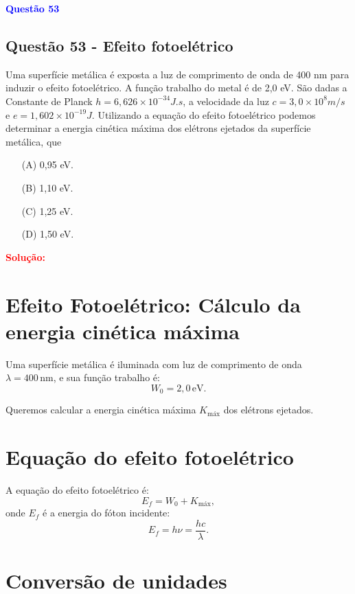 \begin{flushleft}
\textbf{\textcolor{blue}{\Large Quest\~ao 53}}\\
\noindent
\subsection{Quest\~ao 53 - Efeito fotoelétrico}
Uma superfície metálica é exposta a luz de comprimento de onda de 400 nm para induzir o efeito fotoelétrico. A função
trabalho do metal é de 2,0 eV. São dadas a Constante de Planck $h = 6{,}626 \times 10^{-34} J.s$, a velocidade da luz 
$c = 3{,}0 \times 10^8 m/s$ e $e = 1{,}602 \times 10^{-19} J$. Utilizando a equação do efeito fotoelétrico podemos 
determinar a energia cinética máxima dos elétrons ejetados da superfície metálica, que

\begin{itemize}
\item[(A)] 0,95 eV.
\item[(B)] 1,10 eV.
\item[(C)] 1,25 eV.
\item[(D)] 1,50 eV.
\end{itemize}

\vspace{0.5cm}

\textcolor{red}{\textbf{Solução:}}\\

\section*{Efeito Fotoelétrico: Cálculo da energia cinética máxima}

Uma superfície metálica é iluminada com luz de comprimento de onda \( \lambda = 400\,\mathrm{nm} \), e sua função trabalho é:
\[
W_0 = 2{,}0\,\mathrm{eV}.
\]

Queremos calcular a energia cinética máxima \( K_{\text{máx}} \) dos elétrons ejetados.

\section*{Equação do efeito fotoelétrico}

A equação do efeito fotoelétrico é:
\[
E_f = W_0 + K_{\text{máx}},
\]
onde \(E_f\) é a energia do fóton incidente:
\[
E_f = h\nu = \frac{hc}{\lambda}.
\]

\section*{Conversão de unidades}


\end{flushleft}
